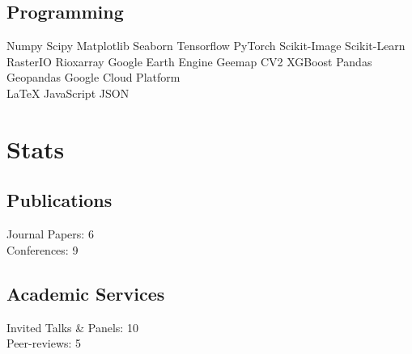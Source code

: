 \documentclass[]{deedy-resume-openfont}
\begin{document}
\begin{minipage}[t]{0.33\textwidth}
\subsection{Programming}
Numpy \textbullet{} 
Scipy \textbullet{} 
Matplotlib \textbullet{} 
Seaborn 
Tensorflow \textbullet{} 
PyTorch \textbullet{} 
Scikit-Image 
Scikit-Learn \textbullet{}
RasterIO \textbullet{} 
Rioxarray  
Google Earth Engine\textbullet{} 
Geemap\textbullet{} 
CV2 
XGBoost \textbullet{} 
Pandas \textbullet{}
Geopandas \textbullet{}
Google Cloud Platform
\\
\LaTeX \textbullet{}
JavaScript \textbullet{} 
JSON 
\sectionsep


\section{Stats}
\subsection{Publications}
Journal Papers: 6
\\
Conferences: 9

\subsection{Academic Services}
Invited Talks \& Panels: 10
\\
Peer-reviews: 5
%
%

\end{minipage} 
\hfill
\end{document}
